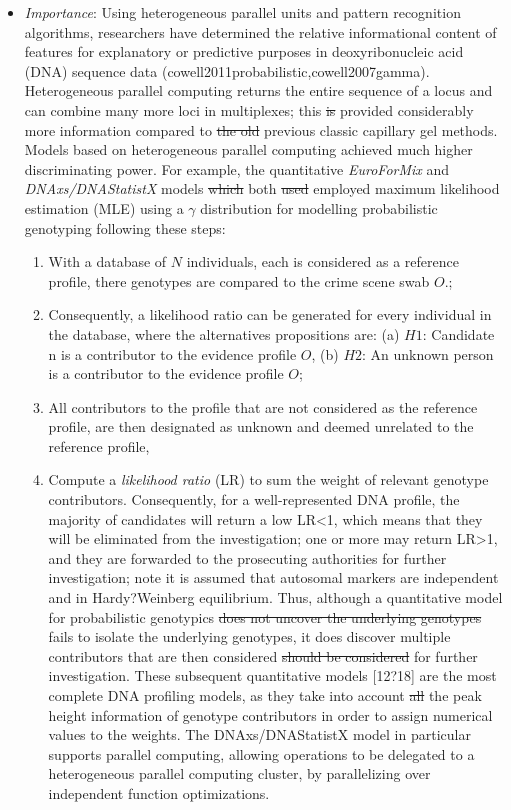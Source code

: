 \documentclass[10pt]{article}[draft]
\begin{document}
\begin{itemize}
	\item  \emph{Importance}: Using heterogeneous parallel units  and pattern recognition algorithms, researchers have determined the relative informational content of features for explanatory or predictive purposes in  deoxyribonucleic acid  (DNA) sequence data (cowell2011probabilistic,cowell2007gamma). Heterogeneous parallel computing returns the entire sequence of a locus and can combine many more loci in multiplexes; this \st{is} provided considerably more information  compared to \st{the old} previous classic capillary gel methods. Models based on heterogeneous parallel computing achieved  much higher discriminating power. For example, the  quantitative \emph{EuroForMix} and \emph{DNAxs/DNAStatistX}  models \st{which} both \st{used} employed maximum likelihood estimation (MLE) using a $\gamma$ distribution for modelling probabilistic genotyping following these steps:
	\begin{enumerate} 
		\item  With a database of $N$ individuals, each is considered as a  reference profile, there genotypes are compared to the crime scene swab $O$.; \\
		\item Consequently, a likelihood ratio can be generated for every individual in the database, where the alternatives propositions are:  (a) $H1$: Candidate n is a contributor to the evidence profile $O$, (b) $H2$: An unknown person is a contributor to the evidence profile $O$;  \\
		\item All contributors to the profile that are not  considered as the reference profile, are then designated as unknown and deemed unrelated to the reference profile, \\
		\item  Compute a \emph{likelihood ratio} (LR) to sum the weight of relevant genotype contributors. Consequently, for a well-represented DNA profile, the majority of candidates will return a low LR<1, which means that they will be eliminated from the investigation; one or more may return LR>1, and they are forwarded to the prosecuting authorities for further investigation; note it is assumed that autosomal markers are independent and in Hardy?Weinberg equilibrium.  Thus, although a quantitative model for probabilistic genotypics \st{does not uncover the underlying genotypes} fails to isolate the underlying genotypes, it does discover multiple contributors that are then considered \st{should be considered} for further investigation. These subsequent {quantitative} models [12?18] are the most complete DNA profiling models, as they take into account \st{all} the peak height information of genotype contributors in order to assign numerical values to the weights. The DNAxs/DNAStatistX model in particular supports parallel computing, allowing operations to be delegated to a heterogeneous parallel computing cluster, by parallelizing over independent function optimizations. 
	\end{enumerate}


\end{itemize}
\end{document}
